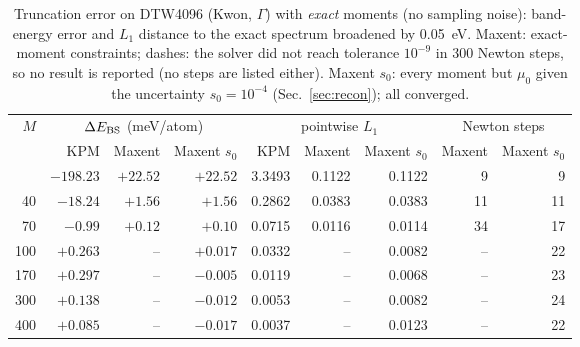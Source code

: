 \begin{table}[t]\caption{Truncation error on DTW4096 (Kwon, $\Gamma$) with \emph{exact} moments (no sampling noise): band-energy error and $L_1$ distance to the exact spectrum broadened by 0.05~eV. Maxent: exact-moment constraints; dashes: the solver did not reach tolerance $10^{-9}$ in 300 Newton steps, so no result is reported (no steps are listed either). Maxent $s_0$: every moment but $\mu_0$ given the uncertainty $s_0=10^{-4}$ (Sec.~\ref{sec:recon}); all converged.}\label{tab:acc}\begin{ruledtabular}\begin{tabular}{rrrrrrrrr}
$M$ & \multicolumn{3}{c}{$\Delta E_{\rm BS}$ (meV/atom)} & \multicolumn{3}{c}{pointwise $L_1$} & \multicolumn{2}{c}{Newton steps} \\ & KPM & Maxent & Maxent $s_0$ & KPM & Maxent & Maxent $s_0$ & Maxent & Maxent $s_0$ \\ \colrule
20 & $-198.23$ & $+22.52$ & $+22.52$ & 3.3493 & 0.1122 & 0.1122 & 9 & 9 \\
40 & $-18.24$ & $+1.56$ & $+1.56$ & 0.2862 & 0.0383 & 0.0383 & 11 & 11 \\
70 & $-0.99$ & $+0.12$ & $+0.10$ & 0.0715 & 0.0116 & 0.0114 & 34 & 17 \\
100 & $+0.263$ & -- & $+0.017$ & 0.0332 & -- & 0.0082 & -- & 22 \\
170 & $+0.297$ & -- & $-0.005$ & 0.0119 & -- & 0.0068 & -- & 23 \\
300 & $+0.138$ & -- & $-0.012$ & 0.0053 & -- & 0.0082 & -- & 24 \\
400 & $+0.085$ & -- & $-0.017$ & 0.0037 & -- & 0.0123 & -- & 22 \\
\end{tabular}\end{ruledtabular}\end{table}
